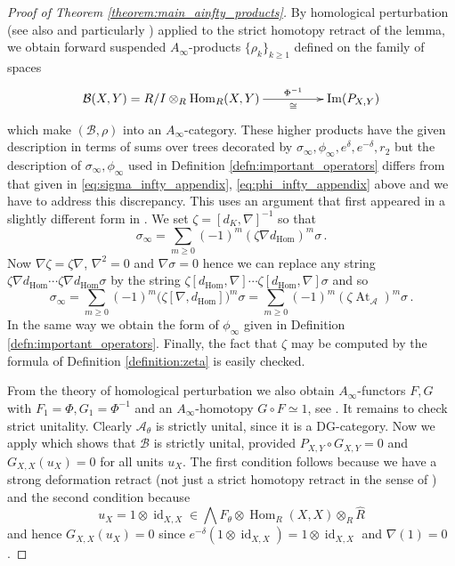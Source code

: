 \documentclass[english,letter paper,12pt,leqno]{article}
\theoremstyle{example}
\numberwithin{equation}{section}
\def\AA{\mathcal{A}}
\def\BB{\mathcal{B}}
\def\Hom{\operatorname{Hom}}
\def\be{\begin{equation}}
\def\ee{\end{equation}}
\DeclareMathOperator{\vAt}{At}
\begin{document}
\begin{proof}[Proof of Theorem \ref{theorem:main_ainfty_products}] 
By homological perturbation \cite[\S 3.3, p.33]{lazaroiu} (see also \cite[\S I]{seidel} and particularly \cite[Remark 1.15]{seidel}) applied to the strict homotopy retract of the lemma, we obtain forward suspended $A_\infty$-products $\{ \rho_k \}_{k \ge 1}$ defined on the family of spaces
\[
\xymatrix@C+2pc{
\BB(X,Y) = R/I \otimes_R \Hom_R(X,Y) \ar[r]_-{\cong}^-{\Phi^{-1}} & \operatorname{Im}(P_{X,Y})
}
\]
which make $(\BB, \rho)$ into an $A_\infty$-category. These higher products have the given description in terms of sums over trees decorated by $\sigma_\infty, \phi_\infty, e^{\delta}, e^{-\delta}, r_2$ but the description of $\sigma_\infty, \phi_\infty$ used in Definition \ref{defn:important_operators} differs from that given in \eqref{eq:sigma_infty_appendix}, \eqref{eq:phi_infty_appendix} above and we have to address this discrepancy. This uses an argument that first appeared in a slightly different form in \cite[(10.3),(10.4)]{pushforward}. We set $\zeta = [d_K, \nabla]^{-1}$ so that
\[
\sigma_\infty = \sum_{m \ge 0} (-1)^m (\zeta \nabla d_{\Hom})^m \sigma\,.
\]
Now $\nabla \zeta = \zeta \nabla$, $\nabla^2 = 0$ and $\nabla \sigma = 0$ hence we can replace any string $\zeta \nabla d_{\Hom} \cdots \zeta \nabla d_{\Hom} \sigma$ by the string $\zeta [d_{\Hom}, \nabla] \cdots \zeta [d_{\Hom}, \nabla] \sigma$ and so
\be\label{eq:rewritten_sigma_infty}
\sigma_\infty = \sum_{m \ge 0} (-1)^m \Big( \zeta [\nabla, d_{\Hom}] \Big)^m \sigma = \sum_{m \ge 0} (-1)^m (\zeta \vAt_{\AA})^m \sigma \,.
\ee
In the same way we obtain the form of $\phi_\infty$ given in Definition \ref{defn:important_operators}. Finally, the fact that $\zeta$ may be computed by the formula of Definition \ref{definition:zeta} is easily checked.

From the theory of homological perturbation we also obtain $A_\infty$-functors $F,G$ with $F_1 = \Phi, G_1 = \Phi^{-1}$ and an $A_\infty$-homotopy $G \circ F \simeq 1$, see \cite{markl_transfer}. It remains to check strict unitality. Clearly $\AA_{\theta}$ is strictly unital, since it is a DG-category. Now we apply \cite[p.37]{lazaroiu} which shows that $\BB$ is strictly unital, provided $P_{X,Y} \circ G_{X,Y} = 0$ and $G_{X,X}(u_X) = 0$ for all units $u_X$. The first condition follows because we have a strong deformation retract (not just a strict homotopy retract in the sense of \cite{lazaroiu}) and the second condition because
\[
u_X = 1 \otimes \operatorname{id}_{X,X} \in \bigwedge F_\theta \otimes \Hom_R(X,X) \otimes_R \widehat{R}
\]
and hence $G_{X,X}(u_X) = 0$ since $e^{-\delta}(1 \otimes \operatorname{id}_{X,X}) = 1 \otimes \operatorname{id}_{X,X}$ and $\nabla(1) = 0$.
\end{proof}%
\end{document}
